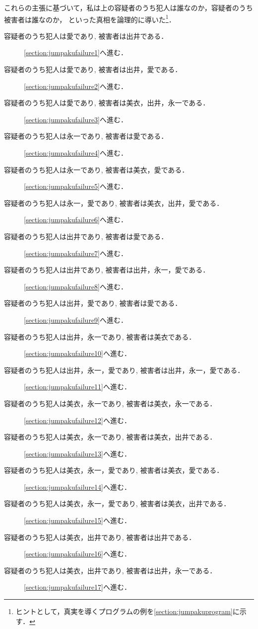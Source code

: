 これらの主張に基づいて，私は上の容疑者のうち犯人は誰なのか，容疑者のうち被害者は誰なのか，
といった真相を論理的に導いた\footnote{ヒントとして，真実を導くプログラムの例を\ref{section:jumpakuprogram}に示す．}．
\begin{description}
\item[容疑者のうち犯人は愛であり, 被害者は出井である．] \ref{section:jumpakufailure1}へ進む．
\item[容疑者のうち犯人は愛であり, 被害者は出井，愛である．] \ref{section:jumpakufailure2}へ進む．
\item[容疑者のうち犯人は愛であり, 被害者は美衣，出井，永一である．] \ref{section:jumpakufailure3}へ進む．
\item[容疑者のうち犯人は永一であり, 被害者は愛である．] \ref{section:jumpakufailure4}へ進む．
\item[容疑者のうち犯人は永一であり, 被害者は美衣，愛である．] \ref{section:jumpakufailure5}へ進む．
\item[容疑者のうち犯人は永一，愛であり, 被害者は美衣，出井，愛である．] \ref{section:jumpakufailure6}へ進む．
\item[容疑者のうち犯人は出井であり, 被害者は愛である．] \ref{section:jumpakufailure7}へ進む．
\item[容疑者のうち犯人は出井であり, 被害者は出井，永一，愛である．] \ref{section:jumpakufailure8}へ進む．
\item[容疑者のうち犯人は出井，愛であり, 被害者は愛である．] \ref{section:jumpakufailure9}へ進む．
\item[容疑者のうち犯人は出井，永一であり, 被害者は美衣である．] \ref{section:jumpakufailure10}へ進む．
\item[容疑者のうち犯人は出井，永一，愛であり, 被害者は出井，永一，愛である．] \ref{section:jumpakufailure11}へ進む．
\item[容疑者のうち犯人は美衣，永一であり, 被害者は美衣，永一である．] \ref{section:jumpakufailure12}へ進む．
\item[容疑者のうち犯人は美衣，永一であり, 被害者は美衣，出井である．] \ref{section:jumpakufailure13}へ進む．
\item[容疑者のうち犯人は美衣，永一，愛であり, 被害者は美衣，愛である．] \ref{section:jumpakufailure14}へ進む．
\item[容疑者のうち犯人は美衣，永一，愛であり, 被害者は美衣，出井である．] \ref{section:jumpakufailure15}へ進む．
\item[容疑者のうち犯人は美衣，出井であり, 被害者は出井である．] \ref{section:jumpakufailure16}へ進む．
\item[容疑者のうち犯人は美衣，出井であり, 被害者は出井，永一である．] \ref{section:jumpakufailure17}へ進む．

\end{description}
